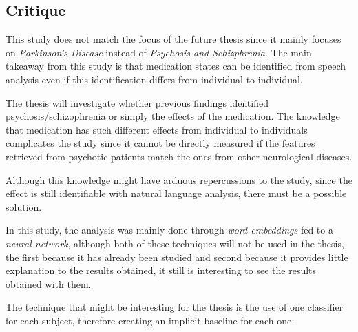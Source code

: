 \documentclass{Paper_Summary}
\begin{document}
\makepapertitle

\breakline

\begin{center}
    \section*{Critique}
\end{center}

    This study does not match the focus of the future thesis since it mainly focuses on \emph{Parkinson's Disease} instead of \emph{Psychosis and Schizphrenia}. The main takeaway from this study is that medication states can be identified from speech analysis even if this identification differs from individual to individual.

    The thesis will investigate whether previous findings identified psychosis/schizophrenia or simply the effects of the medication. The knowledge that medication has such different effects from individual to individuals complicates the study since it cannot be directly measured if the features retrieved from psychotic patients match the ones from other neurological diseases.

    Although this knowledge might have arduous repercussions to the study, since the effect is still identifiable with natural language analysis, there must be a possible solution.

    In this study, the analysis was mainly done through \emph{word embeddings} fed to a \emph{neural network}, although both of these techniques will not be used in the thesis, the first because it has already been studied and second because it provides little explanation to the results obtained, it still is interesting to see the results obtained with them.

    The technique that might be interesting for the thesis is the use of one classifier for each subject, therefore creating an implicit baseline for each one.

\breakline
\end{document}
